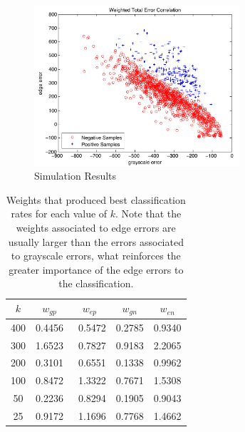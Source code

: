\documentclass[10pt, conference, compsocconf]{IEEEtran}
\begin{document}
\begin{figure}[t]
\centering
\includegraphics[width=3in]{dist_gray_vs_edge_weighted}
\caption{Simulation Results}
\label{dist_weighted}
\end{figure}


\begin{table}
  \caption{Weights that produced best classification rates for each value of $k$. Note that the weights associated to edge errors are usually larger than the errors associated to grayscale errors, what reinforces the greater importance of the edge errors to the classification.}
  \begin{center}
    \begin{tabular}{  c | c  c  c  c  }
      \hline
      $k$ & $w_{gp}$ & $w_{ep}$ & $w_{gn}$ & $w_{en}$ \\
      \hline
      400 & 0.4456 & 0.5472 & 0.2785 & 0.9340 \\
      300 & 1.6523 & 0.7827 & 0.9183 & 2.2065 \\
      200 & 0.3101 & 0.6551 & 0.1338 & 0.9962 \\
      100 & 0.8472 & 1.3322 & 0.7671 & 1.5308 \\
      50  & 0.2236 & 0.8294 & 0.1905 & 0.9043 \\
      25  & 0.9172 & 1.1696 & 0.7768 & 1.4662 \\
      \hline  
    \end{tabular}
  \end{center}
  \label{table-weights}
\end{table}

\end{document}
